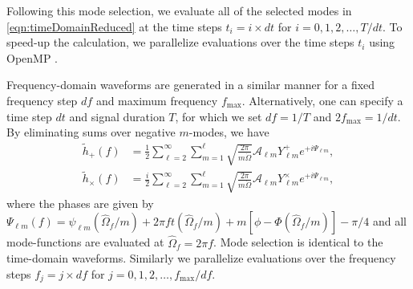 \documentclass[%
 reprint,
 nofootinbib,
 amsmath,amssymb,
 aps,
 prd,
]{revtex4-2}
\begin{document}
Following this mode selection, we evaluate all of the selected modes in \eqref{eqn:timeDomainReduced} at the time steps $t_i = i\times dt$ for $i = 0, 1, 2, \dots, T/dt$. To speed-up the calculation, we parallelize evaluations over the time steps $t_i$ using OpenMP \cite{OpenMP}.

Frequency-domain waveforms are generated in a similar manner for a fixed frequency step $df$ and maximum frequency $f_\mathrm{max}$. Alternatively, one can specify a time step $dt$ and signal duration $T$, for which we set $df = 1/T$ and $2f_\mathrm{max} = 1/dt$. By eliminating sums over negative $m$-modes, we have
\begin{align}
    \tilde{h}_+(f) &= \frac{1}{2}\sum_{\ell = 2}^\infty \sum_{m = 1}^{\ell} \sqrt{\frac{2\pi}{m\dot{\Omega}}}\mathcal{A}_{\ell m} Y_{\ell m}^+ e^{+i\Psi_{\ell m}},
    \\
    \tilde{h}_\times(f) &= \frac{i}{2}\sum_{\ell = 2}^\infty \sum_{m = 1}^{\ell} \sqrt{\frac{2\pi}{m\dot{\Omega}}}\mathcal{A}_{\ell m} Y_{\ell m}^\times e^{+i\Psi_{\ell m}},
\end{align}
where the phases are given by $\Psi_{\ell m}(f) = \psi_{\ell m}(\hat{\Omega}_f/m) + 2\pi f t(\hat{\Omega}_f/m) + m[\phi - \Phi(\hat{\Omega}_f/m)] - \pi/4$ and all mode-functions are evaluated at $\hat{\Omega}_f = 2\pi f$. Mode selection is identical to the time-domain waveforms. Similarly we parallelize evaluations over the frequency steps $f_j = j\times df$ for $j = 0, 1, 2, \dots, f_\mathrm{max}/df$.
\end{document}
